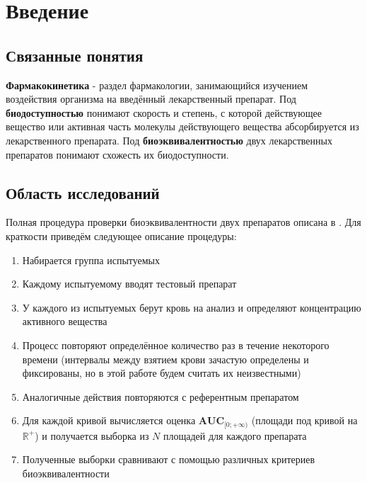 \documentclass[oneside,senior,etd]{BYUPhys}
\begin{document}
\fixmargins
\makepreliminarypages

\oneandhalfspace

\tableofcontents


\section{Введение}
\subsection{Связанные понятия}

\indent \textbf{Фармакокинетика} - раздел фармакологии, занимающийся изучением воздействия организма на введённый лекарственный препарат. \newline
\indent Под \textbf{биодоступностью} понимают скорость и степень, с которой действующее вещество или активная часть молекулы действующего вещества абсорбируется из лекарственного препарата. \newline
\indent Под \textbf{биоэквивалентностью} двух лекарственных препаратов понимают схожесть их биодоступности.

\subsection{Область исследований}

Полная процедура проверки биоэквивалентности двух препаратов описана в \cite{FDA2001, EMA2015}. Для краткости приведём следующее описание процедуры:

\begin{enumerate}
	\item Набирается группа испытуемых
	\item Каждому испытуемому вводят тестовый препарат
	\item У каждого из испытуемых берут кровь на анализ и определяют концентрацию активного вещества
	\item Процесс повторяют определённое количество раз в течение некоторого времени (интервалы между взятием крови зачастую определены и фиксированы, но в этой работе будем считать их неизвестными)
	\item Аналогичные действия повторяются с референтным препаратом
	\item Для каждой кривой вычисляется оценка $\textbf{AUC}_{[0; +\infty)}$ (площади под кривой на $\mathbb{R}^{+}$) и получается выборка из $N$ площадей для каждого препарата
	\item Полученные выборки сравнивают с помощью различных критериев биоэквивалентности
\end{enumerate}
\end{document}
